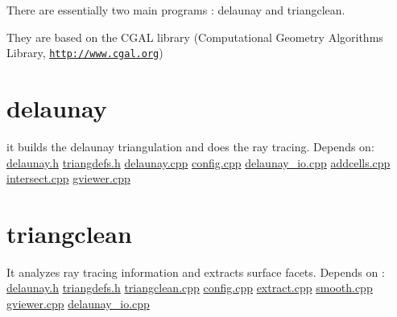 There are essentially two main programs : delaunay and triangclean.

They are based on the CGAL library (Computational Geometry Algorithms Library, \href{http://www.cgal.org}{\tt http://www.cgal.org}) \hypertarget{index_d_sec}{}\section{delaunay}\label{index_d_sec}
it builds the delaunay triangulation and does the ray tracing. Depends on: \hyperlink{delaunay_8h}{delaunay.h} \hyperlink{triangdefs_8h}{triangdefs.h} \hyperlink{delaunay_8cpp}{delaunay.cpp} \hyperlink{config_8cpp}{config.cpp} \hyperlink{delaunay__io_8cpp}{delaunay\_\-io.cpp} \hyperlink{addcells_8cpp}{addcells.cpp} \hyperlink{intersect_8cpp}{intersect.cpp} \hyperlink{gviewer_8cpp_source}{gviewer.cpp} \hypertarget{index_t_sec}{}\section{triangclean}\label{index_t_sec}
It analyzes ray tracing information and extracts surface facets. Depends on : \hyperlink{delaunay_8h}{delaunay.h} \hyperlink{triangdefs_8h}{triangdefs.h} \hyperlink{triangclean_8cpp_source}{triangclean.cpp} \hyperlink{config_8cpp}{config.cpp} \hyperlink{extract_8cpp}{extract.cpp} \hyperlink{smooth_8cpp}{smooth.cpp} \hyperlink{gviewer_8cpp_source}{gviewer.cpp} \hyperlink{delaunay__io_8cpp}{delaunay\_\-io.cpp} 